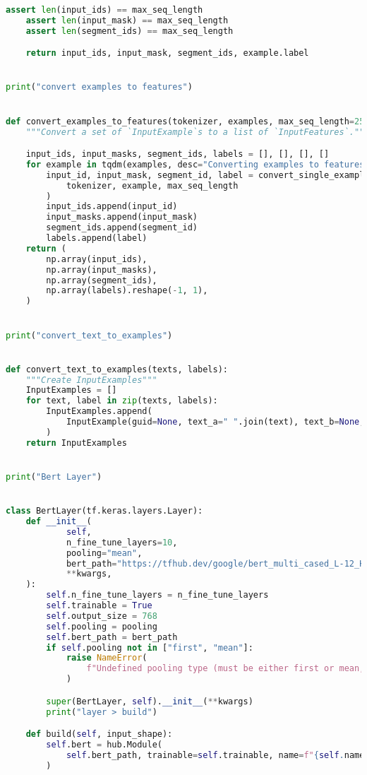 \begin{lstlisting}[language=Python, caption=My attempt to adapt BERT to short text classification]
    assert len(input_ids) == max_seq_length
    assert len(input_mask) == max_seq_length
    assert len(segment_ids) == max_seq_length

    return input_ids, input_mask, segment_ids, example.label


print("convert examples to features")


def convert_examples_to_features(tokenizer, examples, max_seq_length=256):
    """Convert a set of `InputExample`s to a list of `InputFeatures`."""

    input_ids, input_masks, segment_ids, labels = [], [], [], []
    for example in tqdm(examples, desc="Converting examples to features"):
        input_id, input_mask, segment_id, label = convert_single_example(
            tokenizer, example, max_seq_length
        )
        input_ids.append(input_id)
        input_masks.append(input_mask)
        segment_ids.append(segment_id)
        labels.append(label)
    return (
        np.array(input_ids),
        np.array(input_masks),
        np.array(segment_ids),
        np.array(labels).reshape(-1, 1),
    )


print("convert_text_to_examples")


def convert_text_to_examples(texts, labels):
    """Create InputExamples"""
    InputExamples = []
    for text, label in zip(texts, labels):
        InputExamples.append(
            InputExample(guid=None, text_a=" ".join(text), text_b=None, label=labels)
        )
    return InputExamples


print("Bert Layer")


class BertLayer(tf.keras.layers.Layer):
    def __init__(
            self,
            n_fine_tune_layers=10,
            pooling="mean",
            bert_path="https://tfhub.dev/google/bert_multi_cased_L-12_H-768_A-12/1",
            **kwargs,
    ):
        self.n_fine_tune_layers = n_fine_tune_layers
        self.trainable = True
        self.output_size = 768
        self.pooling = pooling
        self.bert_path = bert_path
        if self.pooling not in ["first", "mean"]:
            raise NameError(
                f"Undefined pooling type (must be either first or mean, but is {self.pooling}"
            )

        super(BertLayer, self).__init__(**kwargs)
        print("layer > build")

    def build(self, input_shape):
        self.bert = hub.Module(
            self.bert_path, trainable=self.trainable, name=f"{self.name}_module"
        )


\end{lstlisting}
